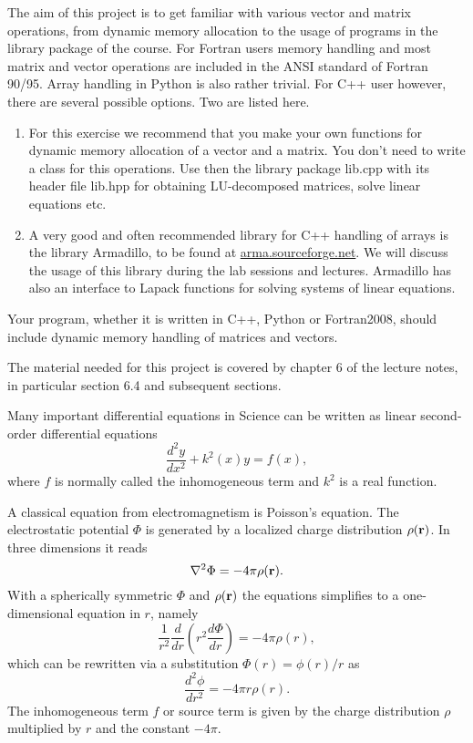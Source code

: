 The aim of this project is to get familiar with various vector and matrix operations,
from dynamic memory allocation to the usage of programs in the library
package of the course. 
For Fortran users memory handling and most matrix and vector operations
are included in the ANSI standard of Fortran 90/95. Array handling in Python is also rather trivial. For C++ user however,
there are several possible options. Two are listed here.
\begin{enumerate}
\item For this exercise we recommend that you make your own functions for dynamic memory allocation of a 
vector and a matrix. You don't need to write a class for this operations. 
Use then the 
library package lib.cpp with its header file 
lib.hpp for obtaining LU-decomposed matrices, solve linear equations
etc.
\item A very good and often recommended library for C++ handling of arrays is the library Armadillo, to be found at \url{arma.sourceforge.net}.  We will discuss the usage of this library during the lab sessions and lectures. Armadillo has also an interface to Lapack functions for solving systems of linear equations.
\end{enumerate}

Your program, whether it is written in C++, Python 
or Fortran2008, should include
dynamic memory handling of matrices and vectors. 

The material needed for this project is covered by chapter 6 of the lecture notes, in particular section 6.4 and subsequent sections.



Many important differential equations in  Science can be written as 
linear second-order differential equations 
\[
\frac{d^2y}{dx^2}+k^2(x)y = f(x),
\]
where $f$ is normally called the inhomogeneous term and $k^2$ is a real function.

A classical equation from electromagnetism is Poisson's equation.
The electrostatic potential $\Phi$ is generated by a localized charge
distribution $\rho ({\bf r})$.   In three dimensions 
it reads
\[
\nabla^2 \Phi = -4\pi \rho ({\bf r}).
\]
With a spherically symmetric $\Phi$ and $\rho ({\bf r})$  the equations
simplifies to a one-dimensional equation in $r$, namely
\[
\frac{1}{r^2}\frac{d}{dr}\left(r^2\frac{d\Phi}{dr}\right) = -4\pi \rho(r),
\]
which can be rewritten via a substitution $\Phi(r)= \phi(r)/r$ as
\[
\frac{d^2\phi}{dr^2}= -4\pi r\rho(r).
\]
The inhomogeneous term $f$ or source term is given by the charge distribution
$\rho$  multiplied by $r$ and the constant $-4\pi$.

